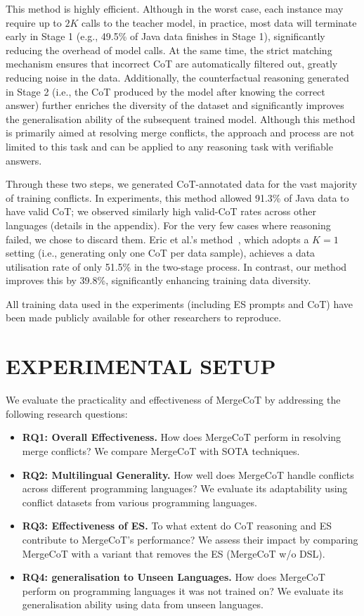 \documentclass[sigconf,review,anonymous]{acmart}
\begin{document}
This method is highly efficient. Although in the worst case, each instance may require up to $2K$ calls to the teacher model, in practice, most data will terminate early in Stage 1 (e.g., 49.5\% of Java data finishes in Stage 1), significantly reducing the overhead of model calls. At the same time, the strict matching mechanism ensures that incorrect CoT are automatically filtered out, greatly reducing noise in the data. 
Additionally, the counterfactual reasoning generated in Stage 2 (i.e., the CoT produced by the model after knowing the correct answer) further enriches the diversity of the dataset and significantly improves the generalisation ability of the subsequent trained model. 
Although this method is primarily aimed at resolving merge conflicts, the approach and process are not limited to this task and can be applied to any reasoning task with verifiable answers.

Through these two steps, we generated CoT-annotated data for the vast majority of training conflicts. In experiments, this method allowed 91.3\% of Java data to have valid CoT; we observed similarly high valid-CoT rates across other languages (details in the appendix). For the very few cases where reasoning failed, we chose to discard them. Eric et al.’s method~\cite{star}, which adopts a $K=1$ setting (i.e., generating only one CoT per data sample), achieves a data utilisation rate of only 51.5\% in the two-stage process. In contrast, our method improves this by 39.8\%, significantly enhancing training data diversity.

All training data used in the experiments (including ES prompts and CoT) have been made publicly available for other researchers to reproduce.


\section{EXPERIMENTAL SETUP}

We evaluate the practicality and effectiveness of MergeCoT by addressing the following research questions:
\begin{itemize}
    \item \textbf{RQ1: Overall Effectiveness.} How does MergeCoT perform in resolving merge conflicts? We compare MergeCoT with SOTA techniques.
    \item \textbf{RQ2: Multilingual Generality.} How well does MergeCoT handle conflicts across different programming languages? We evaluate its adaptability using conflict datasets from various programming languages.
    \item \textbf{RQ3: Effectiveness of ES.} To what extent do CoT reasoning and ES contribute to MergeCoT’s performance? We assess their impact by comparing MergeCoT with a variant that removes the ES (MergeCoT w/o DSL).
    \item \textbf{RQ4: generalisation to Unseen Languages.} How does MergeCoT perform on programming languages it was not trained on? We evaluate its generalisation ability using data from unseen languages.
\end{itemize}
\end{document}
